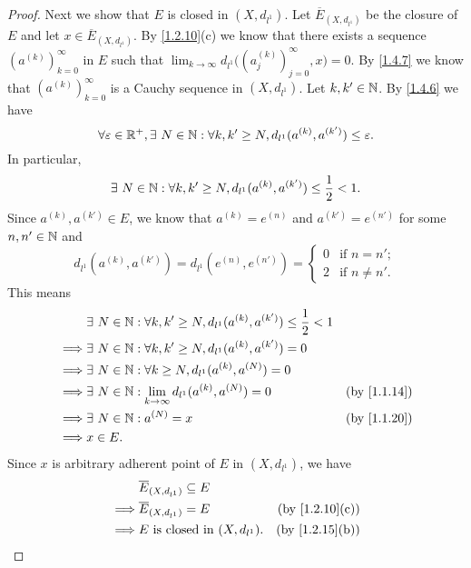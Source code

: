 \begin{proof}
  Next we show that \(E\) is closed in \((X, d_{l^1})\).
  Let \(\overline{E}_{(X, d_{l^1})}\) be the closure of \(E\) and let \(x \in \overline{E}_{(X, d_{l^1})}\).
  By \cref{1.2.10}(c) we know that there exists a sequence \((a^{(k)})_{k = 0}^\infty\) in \(E\) such that \(\lim_{k \to \infty} d_{l^1}\big((a_j^{(k)})_{j = 0}^\infty, x\big) = 0\).
  By \cref{1.4.7} we know that \((a^{(k)})_{k = 0}^\infty\) is a Cauchy sequence in \((X, d_{l^1})\).
  Let \(k, k' \in \mathbb{N}\).
  By \cref{1.4.6} we have
  \[
    \forall \varepsilon \in \mathbb{R}^+, \exists\ N \in \mathbb{N} : \forall k, k' \geq N, d_{l^1}(a^{(k)}, a^{(k')}) \leq \varepsilon.
  \]
  In particular,
  \[
    \exists\ N \in \mathbb{N} : \forall k, k' \geq N, d_{l^1}(a^{(k)}, a^{(k')}) \leq \frac{1}{2} < 1.
  \]
  Since \(a^{(k)}, a^{(k')} \in E\), we know that \(a^{(k)} = e^{(n)}\) and \(a^{(k')} = e^{(n')}\) for some \(n, n' \in \mathbb{N}\) and
  \[
    d_{l^1}(a^{(k)}, a^{(k')}) = d_{l^1}(e^{(n)}, e^{(n')}) = \begin{cases}
      0 & \text{if } n = n';    \\
      2 & \text{if } n \neq n'.
    \end{cases}
  \]
  This means
  \begin{align*}
             & \exists\ N \in \N : \forall k, k' \geq N, d_{l^1}(a^{(k)}, a^{(k')}) \leq \frac{1}{2} < 1                             \\
    \implies & \exists\ N \in \N : \forall k, k' \geq N, d_{l^1}(a^{(k)}, a^{(k')}) = 0                                              \\
    \implies & \exists\ N \in \N : \forall k \geq N, d_{l^1}(a^{(k)}, a^{(N)}) = 0                                                   \\
    \implies & \exists\ N \in \N : \lim_{k \to \infty} d_{l^1}(a^{(k)}, a^{(N)}) = 0                     & \text{(by \cref{1.1.14})} \\
    \implies & \exists\ N \in \N : a^{(N)} = x                                                           & \text{(by \cref{1.1.20})} \\
    \implies & x \in E.
  \end{align*}
  Since \(x\) is arbitrary adherent point of \(E\) in \((X, d_{l^1})\), we have
  \begin{align*}
             & \overline{E}_{(X, d_{l^1})} \subseteq E                                \\
    \implies & \overline{E}_{(X, d_{l^1})} = E         & \text{(by \cref{1.2.10}(c))} \\
    \implies & E \text{ is closed in } (X, d_{l^1}).   & \text{(by \cref{1.2.15}(b))}
  \end{align*}


\end{proof}
